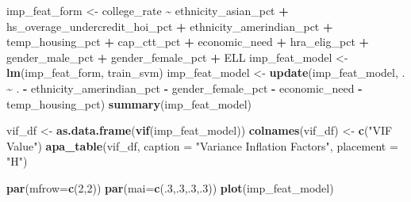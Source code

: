 \documentclass[
  man,floatsintext]{apa6}
\newenvironment{Shaded}{\begin{snugshade}}{\end{snugshade}}
\newcommand{\AttributeTok}[1]{\textcolor[rgb]{0.13,0.29,0.53}{#1}}
\newcommand{\DecValTok}[1]{\textcolor[rgb]{0.00,0.00,0.81}{#1}}
\newcommand{\FunctionTok}[1]{\textcolor[rgb]{0.13,0.29,0.53}{\textbf{#1}}}
\newcommand{\NormalTok}[1]{#1}
\newcommand{\OtherTok}[1]{\textcolor[rgb]{0.56,0.35,0.01}{#1}}
\newcommand{\SpecialCharTok}[1]{\textcolor[rgb]{0.81,0.36,0.00}{\textbf{#1}}}
\newcommand{\StringTok}[1]{\textcolor[rgb]{0.31,0.60,0.02}{#1}}
\begin{document}
\begin{Shaded}
\begin{Highlighting}[]
\NormalTok{imp\_feat\_form }\OtherTok{\textless{}{-}}\NormalTok{ college\_rate }\SpecialCharTok{\textasciitilde{}}\NormalTok{ ethnicity\_asian\_pct }\SpecialCharTok{+}\NormalTok{ hs\_overage\_undercredit\_hoi\_pct }\SpecialCharTok{+}\NormalTok{ ethnicity\_amerindian\_pct }\SpecialCharTok{+}\NormalTok{ temp\_housing\_pct }\SpecialCharTok{+}\NormalTok{ cap\_ctt\_pct }\SpecialCharTok{+}\NormalTok{ economic\_need }\SpecialCharTok{+}\NormalTok{ hra\_elig\_pct }\SpecialCharTok{+}\NormalTok{ gender\_male\_pct }\SpecialCharTok{+}\NormalTok{ gender\_female\_pct }\SpecialCharTok{+}\NormalTok{ ELL}
\NormalTok{imp\_feat\_model }\OtherTok{\textless{}{-}} \FunctionTok{lm}\NormalTok{(imp\_feat\_form, train\_svm)}
\NormalTok{imp\_feat\_model }\OtherTok{\textless{}{-}} \FunctionTok{update}\NormalTok{(imp\_feat\_model, . }\SpecialCharTok{\textasciitilde{}}\NormalTok{ . }\SpecialCharTok{{-}}\NormalTok{ ethnicity\_amerindian\_pct }\SpecialCharTok{{-}}\NormalTok{ gender\_female\_pct }\SpecialCharTok{{-}}\NormalTok{ economic\_need }\SpecialCharTok{{-}}\NormalTok{ temp\_housing\_pct)}
\FunctionTok{summary}\NormalTok{(imp\_feat\_model)}

\NormalTok{vif\_df }\OtherTok{\textless{}{-}} \FunctionTok{as.data.frame}\NormalTok{(}\FunctionTok{vif}\NormalTok{(imp\_feat\_model))}
\FunctionTok{colnames}\NormalTok{(vif\_df) }\OtherTok{\textless{}{-}} \FunctionTok{c}\NormalTok{(}\StringTok{"VIF Value"}\NormalTok{)}
\FunctionTok{apa\_table}\NormalTok{(vif\_df, }\AttributeTok{caption =} \StringTok{"Variance Inflation Factors"}\NormalTok{, }\AttributeTok{placement =} \StringTok{"H"}\NormalTok{)}

\FunctionTok{par}\NormalTok{(}\AttributeTok{mfrow=}\FunctionTok{c}\NormalTok{(}\DecValTok{2}\NormalTok{,}\DecValTok{2}\NormalTok{))}
\FunctionTok{par}\NormalTok{(}\AttributeTok{mai=}\FunctionTok{c}\NormalTok{(.}\DecValTok{3}\NormalTok{,.}\DecValTok{3}\NormalTok{,.}\DecValTok{3}\NormalTok{,.}\DecValTok{3}\NormalTok{))}
\FunctionTok{plot}\NormalTok{(imp\_feat\_model)}


\end{Highlighting}
\end{Shaded}
\end{document}
